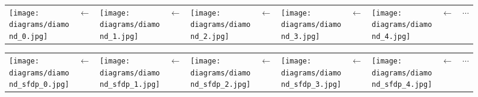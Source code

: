\documentclass[pdftex, 10pt]{amsart}
\begin{document}
\newcommand{\w}{22mm}

\renewcommand{\w}{22mm}
\begin{figure}
\begin{longtable}{m{5mm}m{2mm}m{\w}m{2mm}m{\w}m{2mm}m{\w}m{2mm}m{\w}m{2mm}m{2cm}}
	\texttt{[image: diagrams/diamond\_0.jpg]} &
	$\leftarrow$ &
	\texttt{[image: diagrams/diamond\_1.jpg]} &
	$\leftarrow$ &
	\texttt{[image: diagrams/diamond\_2.jpg]} &
	$\leftarrow$ &
	\texttt{[image: diagrams/diamond\_3.jpg]} &
    $\leftarrow$ &
	\texttt{[image: diagrams/diamond\_4.jpg]} &
    $\leftarrow$ &
    $\cdots$
\end{longtable}
\end{figure}

\begin{figure}
\begin{longtable}{m{5mm}m{2mm}m{\w}m{2mm}m{\w}m{2mm}m{\w}m{2mm}m{\w}m{2mm}m{2cm}}
	\texttt{[image: diagrams/diamond\_sfdp\_0.jpg]} &
	$\leftarrow$ &
	\texttt{[image: diagrams/diamond\_sfdp\_1.jpg]} &
	$\leftarrow$ &
	\texttt{[image: diagrams/diamond\_sfdp\_2.jpg]} &
	$\leftarrow$ &
	\texttt{[image: diagrams/diamond\_sfdp\_3.jpg]} &
    $\leftarrow$ &
	\texttt{[image: diagrams/diamond\_sfdp\_4.jpg]} &
    $\leftarrow$ &
    $\cdots$
\end{longtable}
\end{figure}
\end{document}
